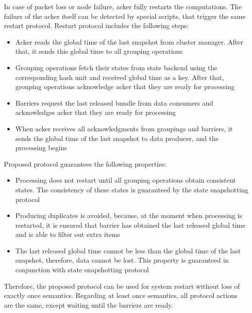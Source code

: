 In case of packet loss or node failure, acker fully restarts the computations. The failure of the acker itself can be detected by special scripts, that trigger the same restart protocol. Restart protocol includes the following steps:

\begin{itemize}
    \item Acker reads the global time of the last snapshot from cluster manager. After that, it sends this global time to all grouping operations
    \item Grouping operations fetch their states from state backend using the corresponding hash unit and received global time as a key. After that, grouping operations acknowledge acker that they are ready for processing 
    \item Barriers request the last released bundle from data consumers and acknowledges acker that they are ready for processing
    \item When acker receives all acknowledgments from groupings and barriers, it sends the global time of the last snapshot to data producer, and the processing begins 
\end{itemize}

Proposed protocol guarantees the following properties:

\begin{itemize}
    \item Processing does not restart until all grouping operations obtain consistent states. The consistency of these states is guaranteed by the state snapshotting protocol
    \item Producing duplicates is avoided, because, at the moment when processing is restarted, it is ensured that barrier has obtained the last released global time and is able to filter out extra items
    \item The last released global time cannot be less than the global time of the last snapshot, therefore, data cannot be lost. This property is guaranteed in conjunction with state snapshotting protocol
\end{itemize}

Therefore, the proposed protocol can be used for system restart without loss of exactly once semantics. Regarding at least once semantics, all protocol actions are the same, except waiting until the barriers are ready.
